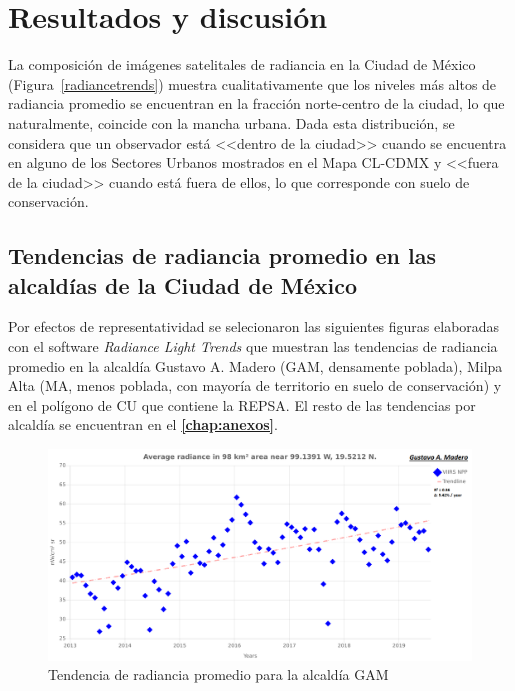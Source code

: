 \chapter{Resultados y discusión}

La composición de imágenes satelitales de radiancia en la Ciudad de México (Figura~\ref{radiancetrends}) muestra cualitativamente que los niveles más altos de radiancia promedio se encuentran en la fracción norte-centro de la ciudad, lo que naturalmente, coincide con la mancha urbana. Dada esta distribución, se considera que un observador está <<dentro de la ciudad>> cuando se encuentra en alguno de los Sectores Urbanos mostrados en el Mapa CL-CDMX y <<fuera de la ciudad>> cuando está fuera de ellos, lo que corresponde con suelo de conservación. 

\section{Tendencias de radiancia promedio en las alcaldías de la Ciudad de México}
\label{subsec:tendenciasradiancia}

Por efectos de representatividad se selecionaron las siguientes figuras elaboradas con el software \textit{Radiance Light Trends} que muestran las tendencias de radiancia promedio en la alcaldía Gustavo A. Madero (GAM, densamente poblada), Milpa Alta (MA, menos poblada, con mayoría de territorio en suelo de conservación) y en el polígono de CU que contiene la REPSA. El resto de las tendencias por alcaldía se encuentran en el \textbf{\autoref{chap:anexos}}.

\begin{figure}[htb]
  \centering
    \includegraphics[width=1\textwidth]{GAM}
  \caption{Tendencia de radiancia promedio para la alcaldía GAM}
  \label{radiancetrendsgam}
\end{figure}

